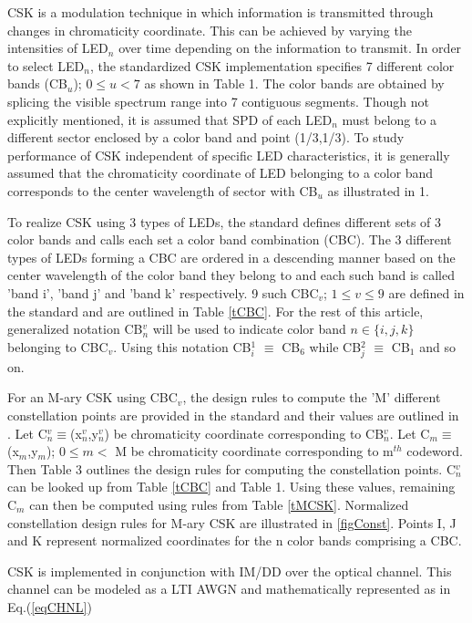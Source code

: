 \documentclass[10pt,letterpaper]{article}
\begin{document}
CSK is a modulation technique in which information is transmitted through changes in chromaticity coordinate. This can be achieved by varying the intensities of LED$_{n}$ over time depending on the information to transmit. In order to select LED$_{n}$, the standardized CSK implementation specifies 7 different color bands (CB$_{u}$); $0\leq u < 7$ as shown in Table 1. The color bands are obtained by splicing the visible spectrum range into 7 contiguous segments. Though not explicitly mentioned, it is assumed that SPD of each LED$_{n}$ must belong to a different sector enclosed by a color band and point (1/3,1/3). To study performance of CSK independent of specific LED characteristics, it is generally assumed that the chromaticity coordinate of LED belonging to a color band corresponds to the center wavelength of sector with CB$_{u}$ as illustrated in \figurename 1.

To realize CSK using 3 types of LEDs, the standard defines different sets of 3 color bands and calls each set a color band combination (CBC). The 3 different types of LEDs forming a CBC are ordered in a descending manner based on the center wavelength of the color band they belong to and each such band is called 'band i', 'band j' and 'band k' respectively. 9 such CBC$_{v}$; $1\leq v\leq 9$ are defined in the standard and are outlined in Table \ref{tCBC}. For the rest of this article, generalized notation CB$^{v}_{n}$ will be used to indicate color band $n\in\{i,j,k\}$ belonging to CBC$_{v}$. Using this notation CB$^{1}_{i}$ $\equiv$ CB$_{6}$ while CB$^{2}_{j}$ $\equiv$ CB$_{1}$ and so on.

For an M-ary CSK using CBC$_{v}$, the design rules to compute the 'M' different constellation points are provided in the standard and their values are outlined in \cite{cskxy}. Let C$^{v}_{n}\equiv$(x$^{v}_{n}$,y$^{v}_{n}$) be chromaticity coordinate corresponding to CB$^{v}_{n}$. Let C$_{m}\equiv$(x$_{m}$,y$_{m}$); $0\leq m <$ M be chromaticity coordinate corresponding to m$^{th}$ codeword. Then Table 3 outlines the design rules for computing the constellation points. C$^{v}_{n}$ can be looked up from Table \ref{tCBC} and Table 1. Using these values, remaining C$_{m}$ can then be computed using rules from Table \ref{tMCSK}. Normalized constellation design rules for M-ary CSK are illustrated in \figurename\ref{figConst}. Points I, J and K represent normalized coordinates for the n color bands comprising a CBC. 

CSK is implemented in conjunction with IM/DD over the optical channel. This channel can be modeled as a LTI AWGN and mathematically represented as in Eq.(\ref{eqCHNL})
\end{document}
